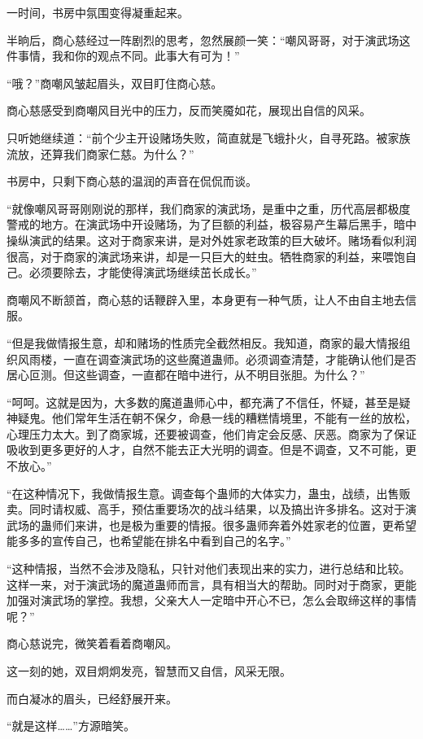 \begin{this_body}
一时间，书房中氛围变得凝重起来。

半晌后，商心慈经过一阵剧烈的思考，忽然展颜一笑：“嘲风哥哥，对于演武场这件事情，我和你的观点不同。此事大有可为！”

“哦？”商嘲风皱起眉头，双目盯住商心慈。

商心慈感受到商嘲风目光中的压力，反而笑魇如花，展现出自信的风采。

只听她继续道：“前个少主开设赌场失败，简直就是飞蛾扑火，自寻死路。被家族流放，还算我们商家仁慈。为什么？”

书房中，只剩下商心慈的温润的声音在侃侃而谈。

“就像嘲风哥哥刚刚说的那样，我们商家的演武场，是重中之重，历代高层都极度警戒的地方。在演武场中开设赌场，为了巨额的利益，极容易产生幕后黑手，暗中操纵演武的结果。这对于商家来讲，是对外姓家老政策的巨大破坏。赌场看似利润很高，对于商家的演武场来讲，却是一只巨大的蛀虫。牺牲商家的利益，来喂饱自己。必须要除去，才能使得演武场继续茁长成长。”

商嘲风不断颔首，商心慈的话鞭辟入里，本身更有一种气质，让人不由自主地去信服。

“但是我做情报生意，却和赌场的性质完全截然相反。我知道，商家的最大情报组织风雨楼，一直在调查演武场的这些魔道蛊师。必须调查清楚，才能确认他们是否居心叵测。但这些调查，一直都在暗中进行，从不明目张胆。为什么？”

“呵呵。这就是因为，大多数的魔道蛊师心中，都充满了不信任，怀疑，甚至是疑神疑鬼。他们常年生活在朝不保夕，命悬一线的糟糕情境里，不能有一丝的放松，心理压力太大。到了商家城，还要被调查，他们肯定会反感、厌恶。商家为了保证吸收到更多更好的人才，自然不能去正大光明的调查。但是不调查，又不可能，更不放心。”

“在这种情况下，我做情报生意。调查每个蛊师的大体实力，蛊虫，战绩，出售贩卖。同时请权威、高手，预估重要场次的战斗结果，以及搞出许多排名。这对于演武场的蛊师们来讲，也是极为重要的情报。很多蛊师奔着外姓家老的位置，更希望能多多的宣传自己，也希望能在排名中看到自己的名字。”

“这种情报，当然不会涉及隐私，只针对他们表现出来的实力，进行总结和比较。这样一来，对于演武场的魔道蛊师而言，具有相当大的帮助。同时对于商家，更能加强对演武场的掌控。我想，父亲大人一定暗中开心不已，怎么会取缔这样的事情呢？”

商心慈说完，微笑着看着商嘲风。

这一刻的她，双目炯炯发亮，智慧而又自信，风采无限。

而白凝冰的眉头，已经舒展开来。

“就是这样……”方源暗笑。


\end{this_body}

